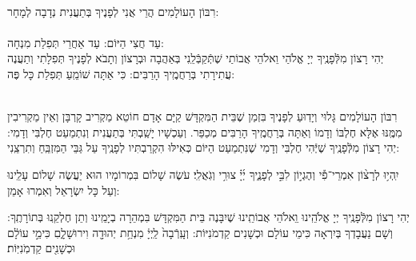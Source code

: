 \documentclass[twoside, openany, parskip=half, 11pt]{book}
\begin{document}
\begin{sometimes}

\\
רִבּוֹן הָעוֹלָמִים הֲרֵי אֲנִי לְפָנֶיךָ בְּתַעֲנִית נְדָבָה לְמָחָר:\\
\\
עַד חֲצִי הַיּוֹם:  עַד אַחֲרֵי תְּפִלַת מִנְחָה:\\
יְהִי רָצוֹן מִלְּֿפָנֶֽיךָ יְיָ אֱלֹהַי וֵאלֹהֵי אֲבוֹתַי שֶׁתְּֿקַבְּֿלֵֽנִי בְּאַהֲבָה וּבְרָצוֹן וְתָבֹא לְפָנֶיךָ תְּפִלָתִי 
וְתַעֲנֶה עֲתִירָתִי בְּרַחֲמֶֽיךָ הָרַבִּים: כִּי אַתָּה שׁוֹמֵֽעַ תְּפִלַת כָּל פֶּה: 

\sepline
 
\nextpage
{}\\
רִבּוֹן הָעוֹלָמִים גָּלוּי וְיָדֽוּעַ לְפָנֶיךָ בִּזְמַן שֶׁבֵּית הַמִּקְדָּשׁ קַיָּם אָדָם חוֹטֵא מַקְרִיב קָרְבָּן וְאֵין מַקְרִיבִין מִמֶּֽנּוּ אֶלָּא חֶלְבּוֹ וְדָמוֹ וְאַתָּה בְּרַחֲמֶֽיךָ הָרַבִּים מְכַפֵּר. וְעַכְשָׁיו יָשַֽׁבְתִּי בְּתַעֲנִית וְנִתְמַעֵט חֶלְבִּי וְדָמִי: יְהִי רָצוֹן מִלְּֿפָנֶֽיךָ שֶׁיְּֿהִי חֶלְבִּי וְדָמִי שֶׁנִּתְמַעַט הַיּוֹם כְּאִילּוּ הִקְרַבְתִּיו לְפָנֶֽיךָ עַל גַּבֵּי הַמִּזְבֵּֽחַ וְתִרְצֵֽנִי:


\end{sometimes}  
  
 יִֽהְי֥וּ לְרָצ֨וֹן אִמְרֵי־פִ֡י וְהֶגְי֣וֹן לִבִּ֣י לְפָנֶ֑יךָ יְ֜יָ֗ צוּרִ֥י וְגֹֽאֲלִֽי׃ עֹשֶׂה שָׁלוֹם בִּמְרוֹמָיו הוּא יַעֲשֶׂה שָׁלוֹם עָלֵֽינוּ וְעַל כָּל יִשְׂרָאֵל וְאִמְרוּ אָמֵן:


\begin{small}

 יְהִי רָצוֹן מִלְּֿפָנֶֽיךָ יְיָ אֱלֹהֵֽינוּ וִֵאלֹהֵי אֲבוֹתֵֽינוּ שֶׁיִבָּנֶה בֵּית הַמִּקְדָּשׁ בִּמְהֵרָה בְיָמֵֽינוּ וְתֵן חֶלְקֵֽנוּ בְּתוֹרָתֶֽךָ: וְשָׁם נַעֲבָדְךָ בְּיִרְאָה כִּימֵי עוֹלָם וּכְשָׁנִים קַדְמֹנִיּוֹת:
וְעָֽרְֿבָה֙ לַֽיְיָ֔ מִנְחַ֥ת יְהוּדָ֖ה וִירוּשָׁלָ֑םִ כִּימֵ֣י עוֹלָ֔ם וּכְשָׁנִ֖ים קַדְמֹֽנִיּֽוֹת׃


\end{small}



\\
\end{document}
